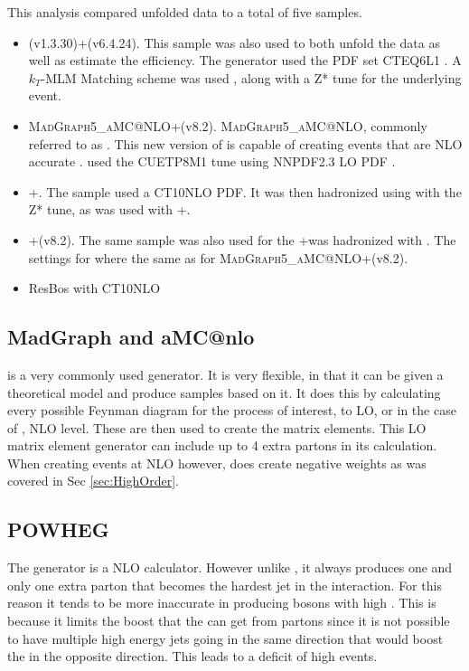 This analysis compared unfolded data to a total of five samples. 
\begin{itemize}
    \item \MADGRAPH(v1.3.30)\cite{Alwall:2011uj}+\PYTHIAsix(v6.4.24)\cite{Sjostrand:2006za}. This sample was also used to both unfold the data as well as estimate the efficiency. The \MADGRAPH generator used the PDF set CTEQ6L1 \cite{Pumplin:2002vw}.  A $k_T$-MLM Matching scheme was used \cite{Alwall:2007fs}, along with a Z* tune \cite{Chatrchyan:2013gfi, Khachatryan:2015pea} for the underlying event.
    \item \textsc{MadGraph5\_aMC@NLO}+\PYTHIAeight(v8.2).  \textsc{MadGraph5\_aMC@NLO}, commonly referred to as \AMCatNLO. This new version of \MADGRAPH is capable of creating events that are NLO accurate \cite{Alwall:2014hca}. \PYTHIAeight used the CUETP8M1 tune \cite{Khachatryan:2015pea} using NNPDF2.3 LO PDF \cite{Ball:2010de,Ball:2011mu}. 
    \item \POWHEG+\PYTHIAsix. The \POWHEG sample\cite{Nason:2004rx, Alioli:2010xd, Alioli:2010qp, Frixione:2007vw} used a CT10NLO PDF\cite{Gao:2013xoa}. It  was then  hadronized using \PYTHIAsix with the Z* tune, as was used with \MADGRAPH+\PYTHIAsix.
    \item \POWHEG+\PYTHIAeight(v8.2). The same \POWHEG sample was also used for the \POWHEG+\PYTHIAsix was hadronized with \PYTHIAeight. The settings for \PYTHIAeight where the same as for \textsc{MadGraph5\_aMC@NLO}+\PYTHIAeight(v8.2).
    \item ResBos \cite{Ladinsky:1993zn,Balazs:1997xd,Landry:2002ix} with CT10NLO
\end{itemize}

\subsection{MadGraph and aMC@nlo}

\MADGRAPH is a very commonly used  generator. It is very flexible, in that it can be given a theoretical model and produce samples based on it. It does this by calculating every possible Feynman diagram for the process of interest, to LO, or in the case of \AMCatNLO, NLO level. These are then used to create the matrix elements. This LO matrix element generator can include up to 4 extra partons in its calculation.  When creating events at NLO however, \AMCatNLO does create negative weights as was covered in Sec \ref{sec:HighOrder}.
\subsection{POWHEG}
The \POWHEG generator is a NLO calculator. However unlike \MADGRAPH, it always produces one and only one extra parton that becomes the hardest jet in the interaction. For this reason it tends to be more inaccurate in producing \Z bosons with high \pt. This is because it limits the boost that the \Z can get from partons since it is not possible to have multiple high energy jets going in the same direction that would boost the \Z in the opposite direction. This leads to a deficit of high \pt \Z events.
